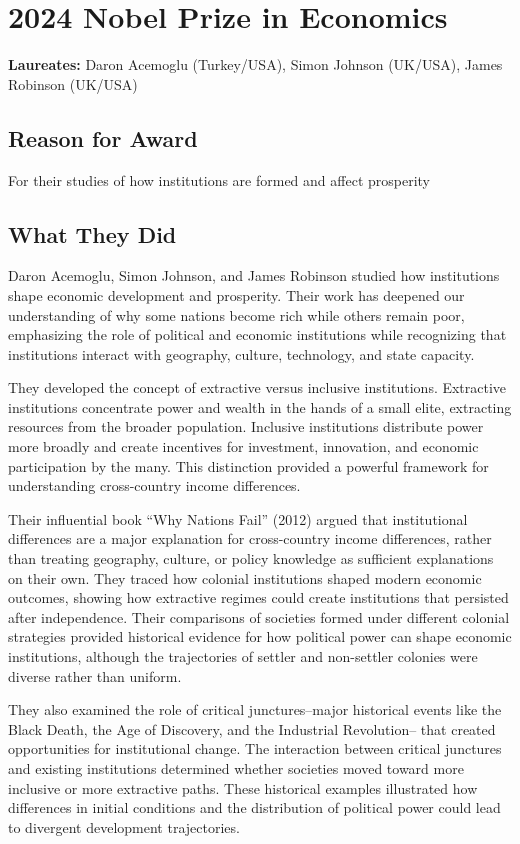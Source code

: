 \chapter{2024 Nobel Prize in Economics}
\textbf{Laureates: }Daron Acemoglu (Turkey/USA), Simon Johnson (UK/USA), James Robinson (UK/USA)

\section*{Reason for Award}
For their studies of how institutions are formed and affect prosperity

\section{What They Did}
Daron Acemoglu, Simon Johnson, and James Robinson studied how institutions
shape economic development and prosperity. Their work has deepened our
understanding of why some nations become rich while others remain poor,
emphasizing the role of political and economic institutions while recognizing
that institutions interact with geography, culture, technology, and state
capacity.

They developed the concept of extractive versus inclusive institutions.
Extractive institutions concentrate power and wealth in the hands of a
small elite, extracting resources from the broader population. Inclusive
institutions distribute power more broadly and create incentives for
investment, innovation, and economic participation by the many. This
distinction provided a powerful framework for understanding cross-country
income differences.

Their influential book ``Why Nations Fail'' (2012) argued that institutional
differences are a major explanation for cross-country income differences, rather
than treating geography, culture, or policy knowledge as sufficient explanations
on their own. They traced how colonial institutions shaped modern economic
outcomes, showing how extractive regimes could create institutions that
persisted after independence. Their comparisons of societies formed under
different colonial strategies provided historical evidence for how political
power can shape economic institutions, although the trajectories of settler and
non-settler colonies were diverse rather than uniform.

They also examined the role of critical junctures--major historical events
like the Black Death, the Age of Discovery, and the Industrial Revolution--
that created opportunities for institutional change. The interaction between
critical junctures and existing institutions determined whether societies
moved toward more inclusive or more extractive paths. These historical
examples illustrated how differences in initial conditions and the distribution
of political power could lead to divergent development trajectories.

